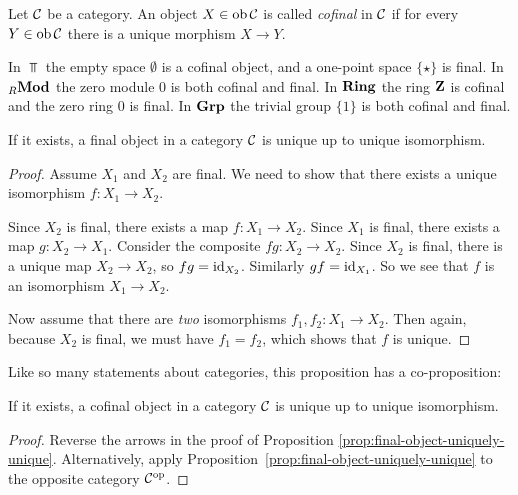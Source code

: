 \begin{definition}
Let ${\mathcal{C}}$ be a category. An object $X\in \operatorname{ob} {\mathcal{C}}$ is called \emph{cofinal} in ${\mathcal{C}}$ if for every $Y\in \operatorname{ob}{\mathcal{C}}$ there is a 
unique morphism $X\to Y$.
\end{definition}

\begin{examples}
In $\Top$ the empty space $\emptyset$ is a cofinal object, and a one-point space $\{\star\}$ is final. In ${}_R\mathbf{Mod}$ the zero module $0$ is both cofinal and final. In $\mathbf{Ring}$ the ring ${\mathbf{Z}}$ is cofinal and the zero ring $0$ is final. In $\mathbf{Grp}$ the trivial group $\{1\}$ is both cofinal and final.
\end{examples}

\begin{proposition}\label{prop:final-object-uniquely-unique}
If it exists, a final object in a category ${\mathcal{C}}$ is unique up to unique isomorphism.
\end{proposition}

\begin{proof}
Assume $X_1$ and $X_2$ are final. We need to show that there exists a unique isomorphism $f\colon X_1\to X_2$.

Since $X_2$ is final, there exists a map $f\colon X_1\to X_2$. Since $X_1$ is final, there exists a map $g\colon X_2\to X_1$. Consider the composite $fg\colon X_2 \to X_2$. Since $X_2$ is final, there is a unique map $X_2\to X_2$, so $fg={\rm id}_{X_2}$. Similarly $gf={\rm id}_{X_1}$. So we see that $f$ is an isomorphism $X_1\to X_2$.

Now assume that there are \emph{two} isomorphisms $f_1,f_2\colon X_1 \to X_2$. Then again, because $X_2$ is final, we must have $f_1=f_2$, which shows that $f$ is unique. 
\end{proof}

Like so many statements about categories, this proposition has a co-proposition:

\begin{proposition}
If it exists, a cofinal object in a category ${\mathcal{C}}$ is unique up to unique isomorphism.
\end{proposition}

\begin{proof}Reverse the arrows in the proof of Proposition \ref{prop:final-object-uniquely-unique}. Alternatively, apply 
Proposition~\ref{prop:final-object-uniquely-unique} to the opposite category ${\mathcal{C}}^{\mathrm{op}}$.
\end{proof}

\newpage
